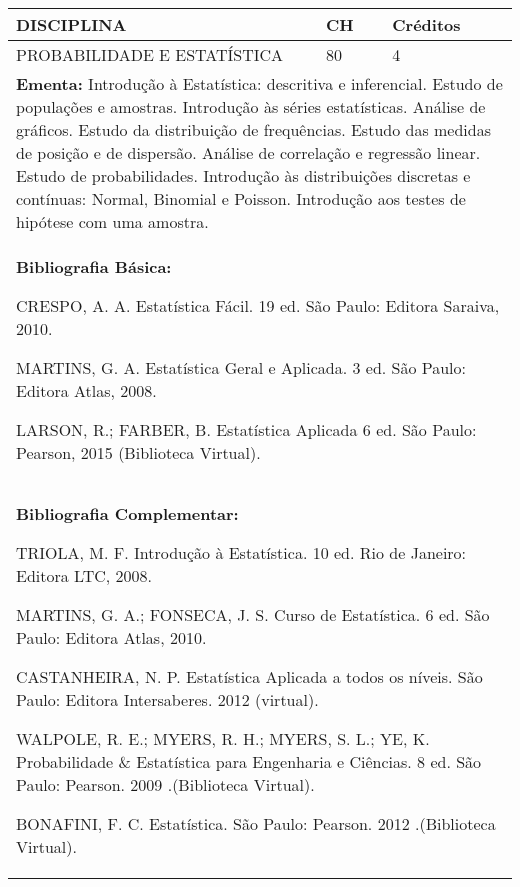 \documentclass[a4paper, 12pt, openright, oneside, german, french, english, brazil]{abntex2}
\begin{document}
\begin{table}[!h]
  \footnotesize
  \centering
  \begin{tabular}{|p{100mm}|p{10mm}|p{20mm}|}
    \hline
    \textbf{DISCIPLINA} & \textbf{CH} & \textbf{Créditos} \\
    \hline
    PROBABILIDADE E ESTATÍSTICA  & 80 & 4 \\
    \hline
    \multicolumn{3}{|p{130mm}|}{\textbf{Ementa:} Introdução à Estatística: descritiva e inferencial. Estudo de populações e amostras. Introdução às séries estatísticas. Análise de gráficos. Estudo da distribuição de frequências. Estudo das medidas de posição e de dispersão. Análise de correlação e regressão linear. Estudo de probabilidades. Introdução às distribuições discretas e contínuas: Normal, Binomial e Poisson. Introdução aos testes de hipótese com uma amostra.} \\
    \hline
    \multicolumn{3}{|p{130mm}|}{\textbf{Bibliografia Básica:}

    CRESPO, A. A. Estatística Fácil. 19 ed. São Paulo: Editora Saraiva, 2010.

MARTINS, G. A. Estatística Geral e Aplicada. 3 ed. São Paulo: Editora Atlas, 2008.

LARSON, R.; FARBER, B. Estatística Aplicada 6 ed. São Paulo: Pearson, 2015
(Biblioteca Virtual).
} \\
    \hline
    \multicolumn{3}{|p{130mm}|}{\textbf{Bibliografia Complementar:}

    TRIOLA, M. F. Introdução à Estatística. 10 ed. Rio de Janeiro: Editora LTC, 2008.

MARTINS, G. A.; FONSECA, J. S. Curso de Estatística. 6 ed. São Paulo: Editora Atlas, 2010.

CASTANHEIRA, N. P. Estatística Aplicada a todos os níveis. São Paulo: Editora Intersaberes. 2012 (virtual).

WALPOLE, R. E.; MYERS, R. H.; MYERS, S. L.; YE, K. Probabilidade \& Estatística para Engenharia e Ciências. 8 ed. São Paulo: Pearson. 2009 .(Biblioteca Virtual).

BONAFINI, F. C. Estatística. São Paulo: Pearson. 2012 .(Biblioteca Virtual).
} \\
    \hline
  \end{tabular}
\end{table}
\end{document}

